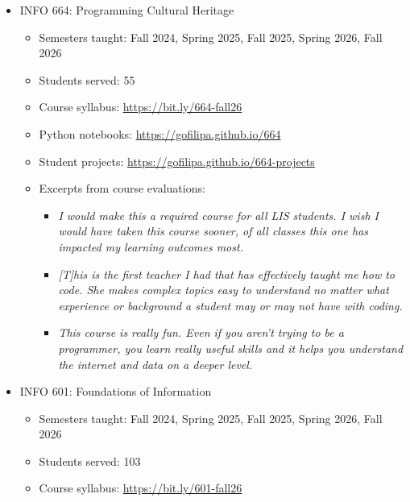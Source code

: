 \documentclass[12pt]{article}
\begin{document}
\begin{itemize}
\begin{itemize}
\begin{itemize}
\item \emph{I feel that now I have a superpower, and I'm eager to keep
practicing!}
\item \emph{Filipa is a great instructor and I've really enjoyed this
class, each week was super interesting and I really appreciate
her perspectives on coding, automation, and pretty much
everything}
\item \emph{The conjunction of critical thinking supported by readings with
technical learning.}
\end{itemize}
\end{itemize}
\item INFO 664: Programming Cultural Heritage
\begin{itemize}
\item Semesters taught: Fall 2024, Spring 2025, Fall 2025, Spring 2026,
Fall 2026
\item Students served: 55
\item Course syllabus: \url{https://bit.ly/664-fall26}
\item Python notebooks: \url{https://gofilipa.github.io/664}
\item Student projects: \url{https://gofilipa.github.io/664-projects}
\item Excerpts from course evaluations:
\begin{itemize}
\item \emph{I would make this a required course for all LIS students. I
wish I would have taken this course sooner, of all classes this
one has impacted my learning outcomes most.}
\item \emph{[T]his is the first teacher I had that has effectively taught
me how to code. She makes complex topics easy to understand no
matter what experience or background a student may or may not
have with coding.}
\item \emph{This course is really fun. Even if you aren't trying to be a
programmer, you learn really useful skills and it helps you
understand the internet and data on a deeper level.}
\end{itemize}
\end{itemize}
\item INFO 601: Foundations of Information 
\begin{itemize}
\item Semesters taught: Fall 2024, Spring 2025, Fall 2025, Spring 2026,
Fall 2026
\item Students served: 103
\item Course syllabus: \url{https://bit.ly/601-fall26}

\end{itemize}
\end{itemize}
\end{document}
